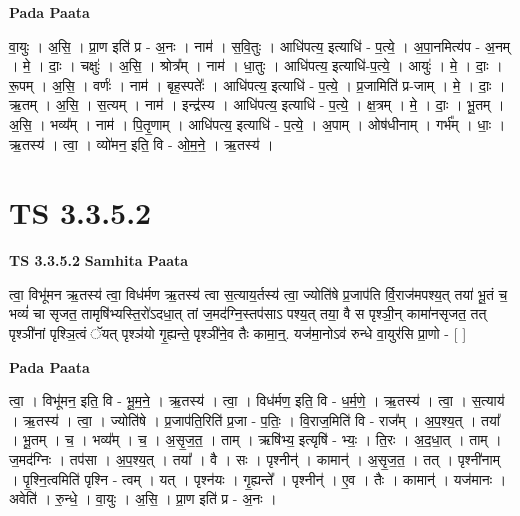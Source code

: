 \documentclass[17pt]{extarticle}
\begin{document}
\textbf{Pada Paata} \newline

वा॒युः । अ॒सि॒ । प्रा॒ण इति॑ प्र - अ॒नः । नाम॑ । स॒वि॒तुः । आधि॑पत्य॒ इत्याधि॑ - प॒त्ये॒ । अ॒पा॒नमित्य॑प - अ॒नम् । मे॒ । दाः॒ । चक्षुः॑ । अ॒सि॒ । श्रोत्र᳚म् । नाम॑ । धा॒तुः । आधि॑पत्य॒ इत्याधि॑-प॒त्ये॒ । आयुः॑ । मे॒ । दाः॒ । रू॒पम् । अ॒सि॒ । वर्णः॑ । नाम॑ । बृह॒स्पतेः᳚ । आधि॑पत्य॒ इत्याधि॑ - प॒त्ये॒ । प्र॒जामिति॑ प्र-जाम् । मे॒ । दाः॒ । ऋ॒तम् । अ॒सि॒ । स॒त्यम् । नाम॑ । इन्द्र॑स्य । आधि॑पत्य॒ इत्याधि॑ - प॒त्ये॒ । क्ष॒त्रम् । मे॒ । दाः॒ । भू॒तम् । अ॒सि॒ । भव्य᳚म् । नाम॑ । पि॒तृ॒णाम् । आधि॑पत्य॒ इत्याधि॑ - प॒त्ये॒ । अ॒पाम् । ओष॑धीनाम् । गर्भ᳚म् । धाः॒ । ऋ॒तस्य॑ । त्वा॒ । व्यो॑मन॒ इति॒ वि - ओ॒म॒ने॒ । ऋ॒तस्य॑ ।  \newline




\section*{ TS 3.3.5.2 }

\textbf{TS 3.3.5.2 } \newline
\textbf{Samhita Paata} \newline

त्वा॒ विभू॑मन ऋ॒तस्य॑ त्वा॒ विध॑र्मण ऋ॒तस्य॑ त्वा स॒त्याय॒र्तस्य॑ त्वा॒ ज्योति॑षे प्र॒जाप॑ति र्वि॒राज॑मपश्य॒त् तया॑ भू॒तं च॒ भव्यं॑ चा सृजत॒ तामृषि॑भ्यस्ति॒रो॑ऽदधा॒त् तां ज॒मद॑ग्नि॒स्तप॑साऽ पश्य॒त् तया॒ वै स पृश्ञी॒न् कामा॑नसृजत॒ तत् पृश्ञी॑नां पृश्ञि॒त्वं ॅयत् पृश्ञ॑यो गृ॒ह्यन्ते॒ पृश्ञी॑ने॒व तैः कामा॒न्॒. यज॑मा॒नोऽव॑ रुन्धे वा॒युर॑सि प्रा॒णो - [  ] \newline

\textbf{Pada Paata} \newline

त्वा॒ । विभू॑मन॒ इति॒ वि - भू॒म॒ने॒ । ऋ॒तस्य॑ । त्वा॒ । विध॑र्मण॒ इति॒ वि - ध॒र्म॒णे॒ । ऋ॒तस्य॑ । त्वा॒ । स॒त्याय॑ । ऋ॒तस्य॑ । त्वा॒ । ज्योति॑षे । प्र॒जाप॑ति॒रिति॑ प्र॒जा - प॒तिः॒ । वि॒राज॒मिति॑ वि - राज᳚म् । अ॒प॒श्य॒त् । तया᳚ । भू॒तम् । च॒ । भव्य᳚म् । च॒ । अ॒सृ॒ज॒त॒ । ताम् । ऋषि॑भ्य॒ इत्यृषि॑ - भ्यः॒ । ति॒रः । अ॒द॒धा॒त् । ताम् । ज॒मद॑ग्निः । तप॑सा । अ॒प॒श्य॒त् । तया᳚ । वै । सः । पृश्नीन्॑ । कामान्॑ । अ॒सृ॒ज॒त॒ । तत् । पृश्नी॑नाम् । पृ॒श्नि॒त्वमिति॑ पृश्नि - त्वम् । यत् । पृश्न॑यः । गृ॒ह्यन्ते᳚ । पृश्नीन्॑ । ए॒व । तैः । कामान्॑ । यज॑मानः । अवेति॑ । रु॒न्धे॒ । वा॒युः । अ॒सि॒ । प्रा॒ण इति॑ प्र - अ॒नः ।  \newline
\end{document}
